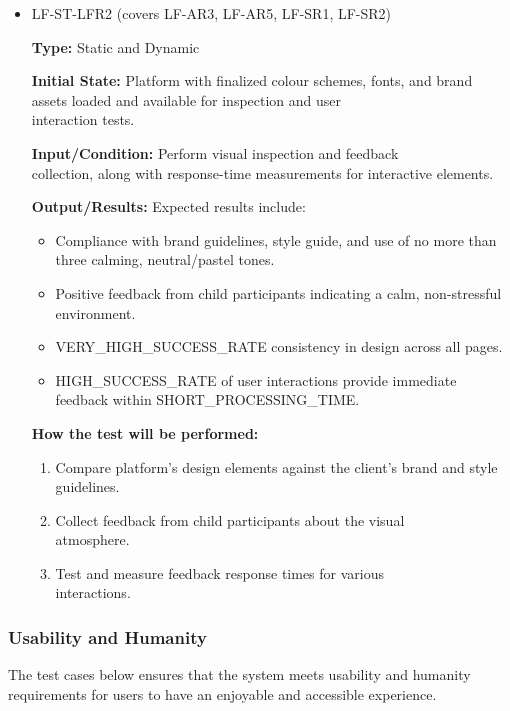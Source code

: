 \documentclass[12pt, titlepage]{article}
\begin{document}
\begin{itemize}
  \item LF-ST-LFR2 (covers LF-AR3, LF-AR5, LF-SR1, LF-SR2)
  \begin{mdframed}[linewidth=0.5mm] 
    \textbf{Type:} Static and Dynamic \par 
    \textbf{Initial State:} Platform with finalized colour schemes, fonts, and brand assets loaded and available for inspection and user \\interaction tests. \par 
    \textbf{Input/Condition:} Perform visual inspection and feedback \\collection, along with response-time measurements for interactive elements. \par 
    \textbf{Output/Results:} Expected results include: 
    \begin{itemize} 
      \item Compliance with brand guidelines, style guide, and use of no more than three calming, neutral/pastel tones. 
      \item Positive feedback from child participants indicating a calm, non-stressful environment. 
      \item VERY\_HIGH\_SUCCESS\_RATE consistency in design across all pages. 
      \item HIGH\_SUCCESS\_RATE of user interactions provide immediate feedback within SHORT\_PROCESSING\_TIME. 
    \end{itemize} \par 
    \textbf{How the test will be performed:} 
    \begin{enumerate}[noitemsep] 
      \item Compare platform’s design elements against the client’s brand and style guidelines. 
      \item Collect feedback from child participants about the visual \\atmosphere. 
      \item Test and measure feedback response times for various \\interactions. 
    \end{enumerate} 
  \end{mdframed} 
\end{itemize}

\subsubsection{Usability and Humanity}
\hspace{2em}The test cases below ensures that the system meets usability and humanity
requirements for users to have an enjoyable and accessible experience.
\end{document}
